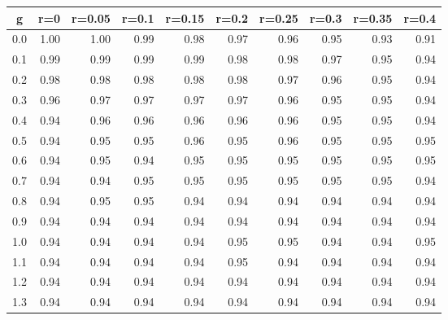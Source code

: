 %
\begin{table}[!tbp]
 \begin{center}
 \begin{tabular}{rrrrrrrrrr}\hline\hline
\multicolumn{1}{c}{g}&\multicolumn{1}{c}{r=0}&\multicolumn{1}{c}{r=0.05}&\multicolumn{1}{c}{r=0.1}&\multicolumn{1}{c}{r=0.15}&\multicolumn{1}{c}{r=0.2}&\multicolumn{1}{c}{r=0.25}&\multicolumn{1}{c}{r=0.3}&\multicolumn{1}{c}{r=0.35}&\multicolumn{1}{c}{r=0.4}\tabularnewline
\hline
0.0&1.00&1.00&0.99&0.98&0.97&0.96&0.95&0.93&0.91\tabularnewline
0.1&0.99&0.99&0.99&0.99&0.98&0.98&0.97&0.95&0.94\tabularnewline
0.2&0.98&0.98&0.98&0.98&0.98&0.97&0.96&0.95&0.94\tabularnewline
0.3&0.96&0.97&0.97&0.97&0.97&0.96&0.95&0.95&0.94\tabularnewline
0.4&0.94&0.96&0.96&0.96&0.96&0.96&0.95&0.95&0.94\tabularnewline
0.5&0.94&0.95&0.95&0.96&0.95&0.96&0.95&0.95&0.95\tabularnewline
0.6&0.94&0.95&0.94&0.95&0.95&0.95&0.95&0.95&0.95\tabularnewline
0.7&0.94&0.94&0.95&0.95&0.95&0.95&0.95&0.95&0.94\tabularnewline
0.8&0.94&0.95&0.95&0.94&0.94&0.94&0.94&0.94&0.94\tabularnewline
0.9&0.94&0.94&0.94&0.94&0.94&0.94&0.94&0.94&0.94\tabularnewline
1.0&0.94&0.94&0.94&0.94&0.95&0.95&0.94&0.94&0.95\tabularnewline
1.1&0.94&0.94&0.94&0.94&0.95&0.94&0.94&0.94&0.94\tabularnewline
1.2&0.94&0.94&0.94&0.94&0.94&0.94&0.94&0.94&0.94\tabularnewline
1.3&0.94&0.94&0.94&0.94&0.94&0.94&0.94&0.94&0.94\tabularnewline
\hline
\end{tabular}

\end{center}

\end{table}

